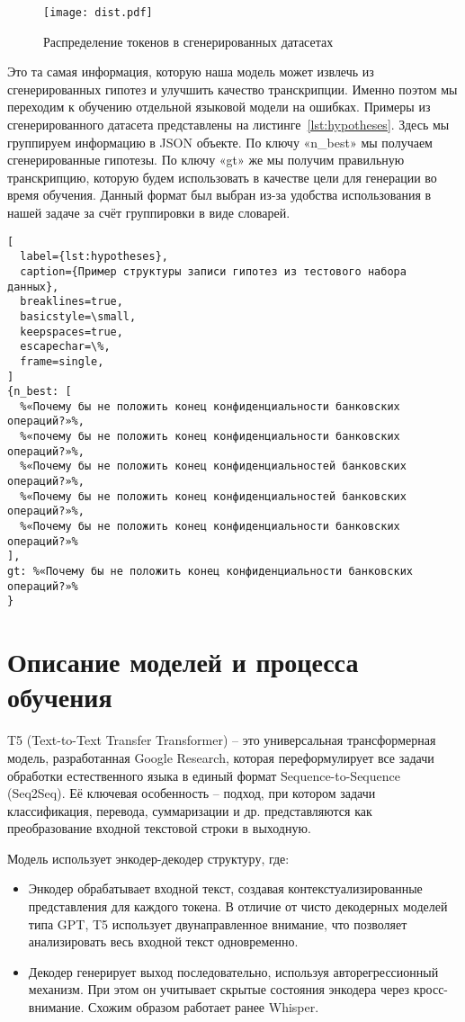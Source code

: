 \begin{figure}[!t]
  \centering
  \texttt{[image: dist.pdf]}
  \caption{Распределение токенов в сгенерированных датасетах}
  \label{fig:dist}
\end{figure}

Это та самая информация, которую наша модель может извлечь из сгенерированных гипотез и улучшить качество транскрипции.
Именно поэтом мы переходим к обучению отдельной языковой модели на ошибках.
Примеры из сгенерированного датасета представлены на листинге~\ref{lst:hypotheses}.
Здесь мы группируем информацию в JSON объекте.
По ключу «n\_best» мы получаем сгенерированные гипотезы.
По ключу «gt» же мы получим правильную транскрипцию, которую будем использовать в качестве цели для генерации во время обучения.
Данный формат был выбран из-за удобства использования в нашей задаче за счёт группировки в виде словарей.

\begin{lstlisting}[
  label={lst:hypotheses},
  caption={Пример структуры записи гипотез из тестового набора данных},
  breaklines=true,
  basicstyle=\small,
  keepspaces=true,
  escapechar=\%,
  frame=single,
]
{n_best: [
  %«Почему бы не положить конец конфиденциальности банковских операций?»%,
  %«почему бы не положить конец конфиденциальности банковских операций?»%,
  %«Почему бы не положить конец конфиденциальностей банковских операций?»%,
  %«Почему бы не положить конец конфиденциальностей банковских операций?»%,
  %«Почему бы не положить конец конфиденциальности банковских операций?»%
],
gt: %«Почему бы не положить конец конфиденциальности банковских операций?»%
} 
\end{lstlisting}

\section{Описание моделей и процесса обучения}

T5 (Text-to-Text Transfer Transformer)\cite{raffel2020exploring} -- это универсальная трансформерная модель, разработанная Google Research, которая переформулирует все задачи обработки естественного языка в единый формат Sequence-to-Sequence (Seq2Seq).
Её ключевая особенность -- подход, при котором задачи классификация, перевода, суммаризации и др. представляются как преобразование входной текстовой строки в выходную.

Модель использует энкодер-декодер структуру, где:
\begin{itemize}
  \item Энкодер обрабатывает входной текст, создавая контекстуализированные представления для каждого токена.
  В отличие от чисто декодерных моделей типа GPT, T5 использует двунаправленное внимание, что позволяет анализировать весь входной текст одновременно.
  \item Декодер генерирует выход последовательно, используя авторегрессионный механизм.
  При этом он учитывает скрытые состояния энкодера через кросс-внимание.
  Схожим образом работает ранее Whisper.
\end{itemize}

